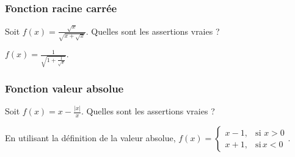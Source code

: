 \subsubsection{Fonction racine carrée}

\begin{question} 
Soit $f(x)= \frac{\sqrt x}{\sqrt{x+\sqrt{x}}}$. Quelles sont les assertions vraies ?
\begin{answers}

    
    
    
    


\end{answers}
\begin{explanations}
$f(x)= \frac{1}{\sqrt{1+\frac{1}{\sqrt{x}}}}.$
\end{explanations}

\end{question}




\subsubsection{Fonction valeur absolue}


\begin{question} 
Soit $f(x)= x-\frac{|x|}{x}$. Quelles sont les assertions vraies ?
\begin{answers}

    
    
    
    

   
\end{answers}
\begin{explanations}
En utilisant la définition de la  valeur absolue, $f(x)=\left\{\begin{array}{cc}x-1,& \mbox{si} \, \, x >0 \\ x+1,& \mbox{si} \,  x <0  \end{array}\right.$.
\end{explanations}

\end{question}


